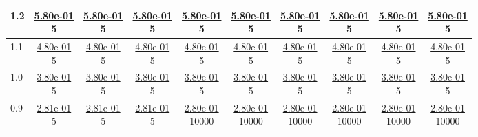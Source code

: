 \begin{table}[H]
\begin{tabular}{|l||c|c|c|c|c|c|c|c|c|}
\hline
 1.2 & \makecell{\ul{5.80e-01} \\ 5} & \makecell{\ul{5.80e-01} \\ 5} & \makecell{\ul{5.80e-01} \\ 5} & \makecell{\ul{5.80e-01} \\ 5} & \makecell{\ul{5.80e-01} \\ 5} & \makecell{\ul{5.80e-01} \\ 5} & \makecell{\ul{5.80e-01} \\ 5} & \makecell{\ul{5.80e-01} \\ 5} & \makecell{\ul{5.80e-01} \\ 5} \\
\hline
 1.1 & \makecell{\ul{4.80e-01} \\ 5} & \makecell{\ul{4.80e-01} \\ 5} & \makecell{\ul{4.80e-01} \\ 5} & \makecell{\ul{4.80e-01} \\ 5} & \makecell{\ul{4.80e-01} \\ 5} & \makecell{\ul{4.80e-01} \\ 5} & \makecell{\ul{4.80e-01} \\ 5} & \makecell{\ul{4.80e-01} \\ 5} & \makecell{\ul{4.80e-01} \\ 5} \\
\hline
 1.0 & \makecell{\ul{3.80e-01} \\ 5} & \makecell{\ul{3.80e-01} \\ 5} & \makecell{\ul{3.80e-01} \\ 5} & \makecell{\ul{3.80e-01} \\ 5} & \makecell{\ul{3.80e-01} \\ 5} & \makecell{\ul{3.80e-01} \\ 5} & \makecell{\ul{3.80e-01} \\ 5} & \makecell{\ul{3.80e-01} \\ 5} & \makecell{\ul{3.80e-01} \\ 5} \\
\hline
 0.9 & \makecell{\ul{2.81e-01} \\ 5} & \makecell{\ul{2.81e-01} \\ 5} & \makecell{\ul{2.81e-01} \\ 5} & \makecell{\ul{2.80e-01} \\ 10000} & \makecell{\ul{2.80e-01} \\ 10000} & \makecell{\ul{2.80e-01} \\ 10000} & \makecell{\ul{2.80e-01} \\ 10000} & \makecell{\ul{2.80e-01} \\ 10000} & \makecell{\ul{2.80e-01} \\ 10000} \\

\end{tabular}
\end{table}
